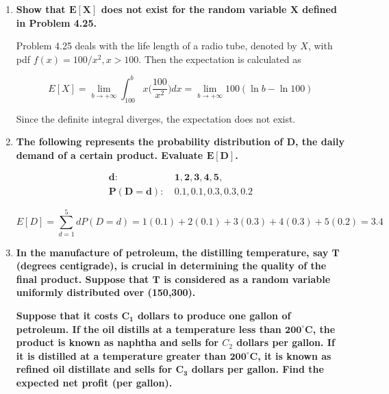 \documentclass[10pt, oneside]{article}
\begin{document}
\begin{enumerate}[label=7.\arabic*]
\begin{enumerate}
	Upon inspection, it is apparent that this equation does not work in the case of $n = 2$. Here we can simply calculate
	
	\[ E[X] = \int^{10000}_{2000} kx^{-1} \ dx = 2500 \ln 5 \approx \boxed{4023.6} \]
	
	\end{enumerate}
	
\item  \begin{tcolorbox}[
  colback=Cerulean!5!white,
  colframe=Cerulean!75!black]
\textbf{Show that $\bm{E[X]}$ does not exist for the random variable $\bm{X}$ defined in Problem 4.25.}
\end{tcolorbox}

Problem 4.25 deals with the life length of a radio tube, denoted by $X$, with pdf $f(x) = 100/x^2, x > 100$. Then the expectation is calculated as

\[ E[X] = \lim_{b \rightarrow +\infty} \int^b_{100} x \Big( \frac{100}{x^2} \Big) dx =  \lim_{b \rightarrow + \infty} 100 (\ln b - \ln 100)\] 

Since the definite integral diverges, the expectation does not exist.

\item  \begin{tcolorbox}[
  colback=Cerulean!5!white,
  colframe=Cerulean!75!black]
\textbf{The following represents the probability distribution of $\bm{D}$, the daily demand of a certain product. Evaluate $\bm{E[D]}$.}

\begin{align*}
\bm{d:}& \ \bm{1, 2, 3, 4, 5,} \\
\bm{P(D = d):}& \ \bm{0.1, 0.1, 0.3, 0.3, 0.2}
\end{align*}
\end{tcolorbox}

\[ E[D] = \sum^5_{d=1} d P(D = d) = 1(0.1) + 2(0.1) + 3(0.3) + 4(0.3) + 5(0.2) = \boxed{3.4} \]

\item  \begin{tcolorbox}[
  colback=Cerulean!5!white,
  colframe=Cerulean!75!black]
\textbf{In the manufacture of petroleum, the distilling temperature, say $\bm{T}$ (degrees centigrade), is crucial in determining the quality of the final product. Suppose that $\bm{T}$ is considered as a random variable uniformly distributed over (150,300).}

\textbf{Suppose that it costs $\bm{C_1}$ dollars to produce one gallon of petroleum. If the oil distills at a temperature less than $\bm{200^\circ}$C, the product is known as naphtha and sells for $C_2$ dollars per gallon. If it is distilled at a temperature greater than $\bm{200^\circ}$C, it is known as refined oil distillate and sells for $\bm{C_3}$ dollars per gallon. Find the expected net profit (per gallon).}
\end{tcolorbox}


\end{enumerate}
\end{document}
